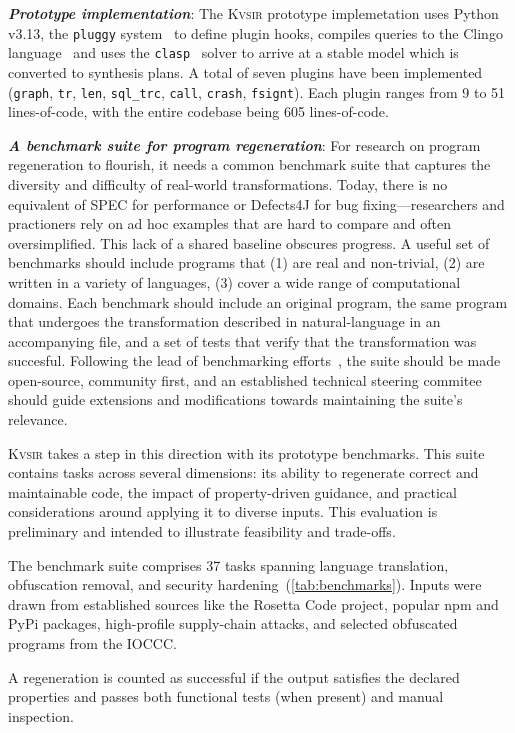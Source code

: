 \documentclass[sigplan,review,anonymous,10pt]{acmart}
\newcommand{\sys}{{\scshape Kv{\textalpha}sir}\xspace}
\newcommand{\heading}[1]{\vspace{2pt}\noindent\textbf{\emph{#1}}:\enspace}
\newcommand{\ttt}[1]{\texttt{#1}\xspace}
\begin{document}
\heading{Prototype implementation}
The \sys prototype implemetation uses Python v3.13,
the \ttt{pluggy} system~\cite{pluggy} to define plugin hooks,
compiles queries to the Clingo language~\cite{DBLP:journals/corr/GebserKKS14} and uses the \ttt{clasp}~\cite{gebser2007clasp}
solver to arrive at a stable model which is converted to synthesis plans. 
A total of seven plugins have been implemented (\ttt{graph}, \ttt{tr}, \ttt{len}, \ttt{sql\_trc}, \ttt{call}, \ttt{crash}, \ttt{fsignt}).
Each plugin ranges from 9 to 51 lines-of-code,
with the entire codebase being 605 lines-of-code.

\heading{A benchmark suite for program regeneration}
For research on program regeneration to flourish, it needs a common benchmark
suite that captures the diversity and difficulty of real-world transformations.
Today, there is no equivalent of SPEC for performance or Defects4J for bug
fixing---researchers and practioners rely on ad hoc examples that are hard to compare and often
oversimplified.
This lack of a shared baseline obscures progress. 
A useful set of benchmarks should include
programs that
(1) are real and non-trivial,
(2) are written in a variety of languages, 
(3) cover a wide range of computational domains.
Each benchmark should include an original program, 
the same program that undergoes the transformation described in natural-language 
in an accompanying file, and a set of tests that verify that the transformation was succesful.
Following the lead of benchmarking efforts~\cite{SPEC_CPU2017, dacapo2006, koala:atc:2025}, the suite should be made open-source, community 
first, and an established technical steering commitee should guide extensions and modifications towards maintaining the suite's relevance.

\sys takes a step in this direction with its prototype benchmarks.
This suite contains tasks across several dimensions: its
ability to regenerate correct and maintainable
code, the impact of property-driven guidance,
and practical considerations around applying it
to diverse inputs. This evaluation is
preliminary and intended to illustrate
feasibility and trade-offs.

The benchmark suite comprises 37 tasks spanning language translation, obfuscation
removal, and security hardening~(\cref{tab:benchmarks}).
Inputs were drawn from established sources
like the Rosetta Code project, popular npm and PyPi packages, high-profile supply-chain attacks,
and selected obfuscated programs from the IOCCC.

A regeneration is counted as successful if the output satisfies the declared
properties and passes both functional tests (when present) and manual inspection.
\end{document}
